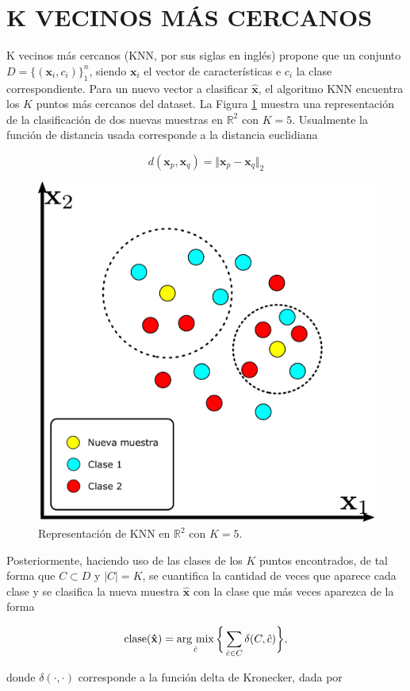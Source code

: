 \section{K VECINOS MÁS CERCANOS}

K vecinos más cercanos (KNN, por sus siglas en inglés) propone que un conjunto $D = \{(\mathbf{x}_i, c_i)\}_1^n$, siendo $\mathbf{x}_i$ el vector de características e $c_i$ la clase correspondiente. Para un nuevo vector a clasificar $\mathbf{\hat{x}}$, el algoritmo KNN encuentra los $K$ puntos más cercanos del dataset. La Figura \ref{fig:knn} muestra una representación de la clasificación de dos nuevas muestras en $\mathbb{R}^2$ con $K = 5$. Usualmente la función de distancia usada corresponde a la distancia euclidiana

\begin{equation}
    d(\mathbf{x}_p,\mathbf{x}_q) = \Vert \mathbf{x}_p-\mathbf{x}_q \Vert_2
    \label{eq:distancia_euclidiana}
\end{equation}

\begin{figure}[H]
    \centering
    \includegraphics[width=0.4\linewidth]{images/knn.pdf}
    \caption{\hspace{2mm}Representación de KNN en $\mathbb{R}^2$ con $K = 5$.}
    \label{fig:knn}
\end{figure}

Posteriormente, haciendo uso de las clases de los $K$ puntos encontrados, de tal forma que $C \subset D$ y $\vert C \vert = K$, se cuantifica la cantidad de veces que aparece cada clase y se clasifica la nueva muestra $\mathbf{\hat{x}}$ con la clase que más veces aparezca de la forma

\begin{equation}
    \mathrm{clase}(\mathbf{\hat{x}}) =  \operatorname*{arg \ mix}_{\hat{c}} \bigg\{ \sum_{\hat{c} \in C} \delta(C,\hat{c})\bigg\},
\end{equation}

donde $\delta(\cdot,\cdot)$ corresponde a la función delta de Kronecker, dada por

